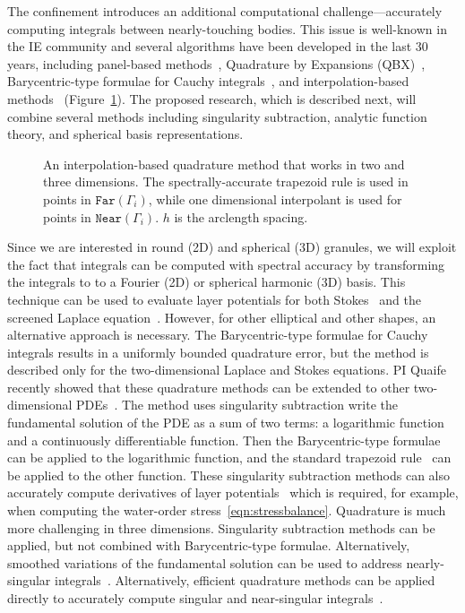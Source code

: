 The confinement introduces an additional computational
challenge---accurately computing integrals between nearly-touching
bodies. This issue is well-known in the IE community and several
algorithms have been developed in the last 30 years, including
panel-based methods~\cite{helsing_2008a, helsing_tutorial_2012},
Quadrature by Expansions (QBX)~\cite{din-hua-mar-tan2021,
klo-bar-gre-one2013, ste-bar2022, af2018sisc}, Barycentric-type formulae
for Cauchy integrals~\cite{bar2014, bar-wu-vee2015, ioa-pap-per1991},
and interpolation-based methods~\cite{ying_2006, qua-bir2014,
rah-vee-zor-bir2015} (Figure~\ref{fig:interpquad}). The proposed
research, which is described next, will combine several methods
including singularity subtraction, analytic function theory, and
spherical basis representations.

\begin{figure}
  \centering
  
  \caption{\label{fig:interpquad} \footnotesize An interpolation-based
  quadrature method that works in two and three dimensions. The
  spectrally-accurate trapezoid rule is used in points in
  $\mathtt{Far}(\Gamma_i)$, while one dimensional interpolant is used
  for points in $\mathtt{Near}(\Gamma_i)$. $h$ is the arclength
  spacing.}
\end{figure}

Since we are interested in round (2D) and spherical (3D) granules, we
will exploit the fact that integrals can be computed with spectral
accuracy by transforming the integrals to to a Fourier (2D) or spherical
harmonic (3D) basis. This technique can be used to evaluate layer
potentials for both Stokes~\cite{cor-vee2018} and the screened Laplace
equation~\cite{koh-cor-che-vee2021}. However, for other elliptical and
other shapes, an alternative approach is necessary. The Barycentric-type
formulae for Cauchy integrals results in a uniformly bounded quadrature
error, but the method is described only for the two-dimensional Laplace
and Stokes equations. PI Quaife recently showed that these quadrature
methods can be extended to other two-dimensional
PDEs~\cite{che-lin-her-qua2022}. The method uses singularity subtraction
write the fundamental solution of the PDE as a sum of two terms: a
logarithmic function and a continuously differentiable function. Then
the Barycentric-type formulae can be applied to the logarithmic
function, and the standard trapezoid rule~\cite{tre-wei2014} can be
applied to the other function. These singularity subtraction methods can
also accurately compute derivatives of layer potentials~\cite{car2021,
car2020, car-kha-kim2018} which is required, for example, when computing
the water-order stress~\eqref{eqn:stressbalance}. Quadrature is much
more challenging in three dimensions. Singularity subtraction methods
can be applied, but not combined with Barycentric-type formulae.
Alternatively, smoothed variations of the fundamental solution can be
used to address nearly-singular integrals~\cite{beale1, cor2001,
tlu-bea2019}.  Alternatively, efficient quadrature methods can be
applied directly to accurately compute singular and near-singular
integrals~\cite{khayat_2005, gimbutas2013sisc}.

